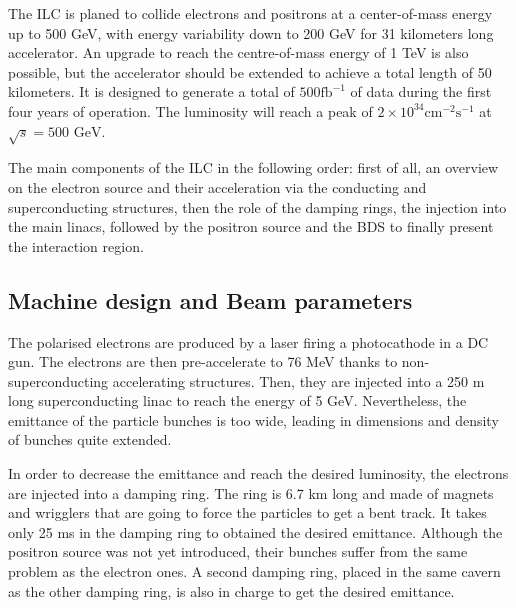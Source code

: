     The ILC is planed to collide electrons and positrons at a center-of-mass energy up to 500 GeV, with energy variability down to 200 GeV for 31 kilometers long accelerator. 
    An upgrade to reach the centre-of-mass energy of 1 TeV is also possible, but the accelerator should be extended to achieve a total length of 50 kilometers.
    It is designed to generate a total of $500 \text{fb}^{-1}$ of data during the first four years of operation. The luminosity will reach a peak of $2 \times 10^{34}\text{cm}^{-2}\text{s}^{-1}$ at $\sqrt s = 500 \text{ GeV}$.


    The main components of the ILC in the following order: first of all, an overview on the electron source and their acceleration via the conducting and superconducting structures, then the role of the damping rings, the injection into the main linacs, followed by the positron source and the \gls{BDS} to finally present the interaction region.

    \subsection{Machine design and Beam parameters}
    \label{subsec:design}

    The polarised electrons are produced by a laser firing a photocathode in a \gls{DC} gun.
    The electrons are then pre-accelerate to 76 MeV thanks to non-superconducting accelerating structures.
    Then, they are injected into a 250 m long superconducting linac to reach the energy of 5 GeV.
    Nevertheless, the emittance of the particle bunches is too wide, leading in dimensions and density of bunches quite extended.
 
    In order to decrease the emittance and reach the desired luminosity, the electrons are injected into a damping ring.
    The ring is 6.7 km long and made of magnets and wrigglers that are going to force the particles to get a bent track.
    It takes only 25 ms in the damping ring to obtained the desired emittance.
    Although the positron source was not yet introduced, their bunches suffer from the same problem as the electron ones. 
    A second damping ring, placed in the same cavern as the other damping ring, is also in charge to get the desired emittance.

